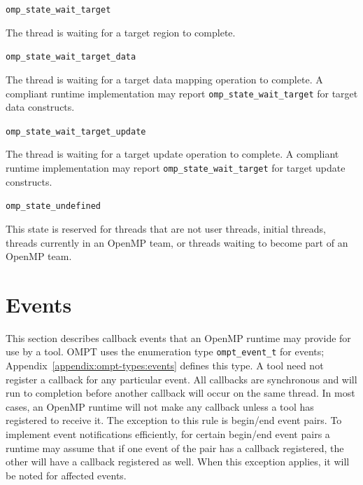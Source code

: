 \documentclass{article}
\newcommand{\descheader}[1]{{\needspace{3\baselineskip}\vspace{1em}\noindent \fbox{#1}}}
\begin{document}
\begin{description}

\item \lstinline|omp_state_wait_target| 

  The thread is waiting for a target region to complete.

\item \lstinline|omp_state_wait_target_data| 

  The thread is waiting for a target data mapping operation to complete. 
  A  compliant runtime implementation may report \lstinline|omp_state_wait_target| for target data constructs.

\item \lstinline|omp_state_wait_target_update| 

  The thread is waiting for a target  update operation to complete. 
  A  compliant runtime implementation may report \lstinline|omp_state_wait_target| for target update constructs.

\end{description}

\descheader{Undefined}

\begin{description}

\item \lstinline|omp_state_undefined| 

  This state is reserved for threads that are not user threads,
  initial threads, threads currently in an OpenMP team, or threads
  waiting to become part of an OpenMP team.

\end{description}

\section{Events}
\label{sec:events} 

This section describes callback events that an OpenMP runtime 
may provide for use by a tool. OMPT uses the enumeration type \lstinline|ompt_event_t| for events; 
Appendix~\ref{appendix:ompt-types:events} defines this type. 
A tool need not register a callback for any particular event.
All callbacks are synchronous and will run to completion before another callback will occur on the same thread.
In most cases, an OpenMP runtime will not make any callback unless a  tool has registered to receive it. The exception to this rule is begin/end event pairs. 
To implement event notifications efficiently, for certain begin/end event pairs a runtime may assume that if one event of the pair has a callback registered, the other will have a callback registered as well. When this exception applies, it will be noted for affected events.
\end{document}
